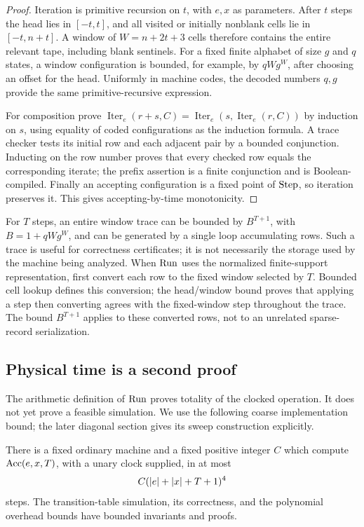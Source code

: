 \begin{proof}
Iteration is primitive recursion on \(t\), with \(e,x\) as parameters.
After \(t\) steps the head lies in \([-t,t]\), and all visited or initially
nonblank cells lie in \([-t,n+t]\). A window of
\(W=n+2t+3\) cells therefore contains the entire relevant tape, including
blank sentinels. For a fixed finite alphabet of size \(g\) and \(q\) states,
a window configuration is bounded, for example, by
\(qWg^W\), after choosing an offset for the head. Uniformly in machine codes,
the decoded numbers \(q,g\) provide the same primitive-recursive expression.

For composition prove
\(\operatorname{Iter}_{e}(r+s,C)=
\operatorname{Iter}_{e}(s,\operatorname{Iter}_{e}(r,C))\)
by induction on \(s\), using equality of coded configurations as the
induction formula. A trace checker tests its initial row and each adjacent
pair by a bounded conjunction. Inducting on the row number proves that every
checked row equals the corresponding iterate; the prefix assertion is a
finite conjunction and is Boolean-compiled. Finally an accepting
configuration is a fixed point of \(\operatorname{Step}\), so iteration preserves it.
This gives accepting-by-time monotonicity.
\end{proof}

For \(T\) steps, an entire window trace can be bounded by
\(B^{T+1}\), with \(B=1+qWg^W\), and can be generated by a single loop
accumulating rows. Such a trace is useful for correctness certificates; it is
not necessarily the storage used by the machine being analyzed.
When \(\operatorname{Run}\) uses the normalized finite-support representation, first
convert each row to the fixed window selected by \(T\). Bounded cell lookup
defines this conversion; the head/window bound proves that applying a step
then converting agrees with the fixed-window step throughout the trace.
The bound \(B^{T+1}\) applies to these converted rows, not to an unrelated
sparse-record serialization.

\subsection{Physical time is a second proof}

The arithmetic definition of \(\operatorname{Run}\) proves totality of the clocked
operation. It does not yet prove a feasible simulation. We use the following
coarse implementation bound; the later diagonal section gives its sweep
construction explicitly.

\begin{lemma}
\label{lem:coarseU}
There is a fixed ordinary machine and a fixed positive integer \(C\) which
compute \(\operatorname{Acc}(e,x,T)\), with a unary clock supplied, in at most
\[
 C(\lvert e\rvert+\lvert x\rvert+T+1)^4
\]
steps. The transition-table simulation, its correctness, and the polynomial
overhead bounds have bounded invariants and \ipra{} proofs.
\end{lemma}

